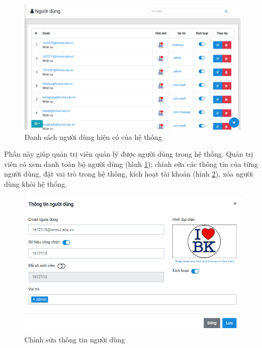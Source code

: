 \begin{figure}[H]
    \centering
    \includegraphics[width=15cm]{img/Screen/user.png}
    \caption{Danh sách người dùng hiện có của hệ thống}
    \label{fig:fig_danh_sach_nguoi_dung}
\end{figure}
Phần này giúp quản trị viên quản lý được người dùng trong hệ thống. Quản trị viên có xem danh toàn bộ người dùng (hình \ref{fig:fig_danh_sach_nguoi_dung}); chỉnh sửa các thông tin của từng người dùng, đặt vai trò trong hệ thống, kích hoạt tài khoản (hình \ref{fig:fig_edit_nguoi_dung}), xóa người dùng khỏi hệ thổng.\\
\begin{figure}[H]
    \centering
    \includegraphics[width=15cm]{img/Screen/editUser.png}
    \caption{Chỉnh sửa thông tin người dùng}
    \label{fig:fig_edit_nguoi_dung}
\end{figure}
